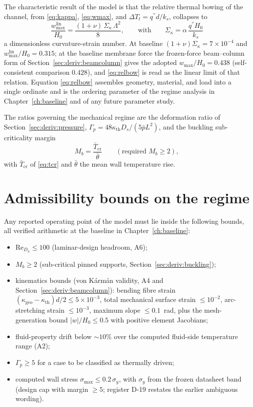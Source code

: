 The characteristic result of the model is that the relative thermal bowing of the channel,
from \eqref{eq:kappa}, \eqref{eq:wmax}, and $\Delta T_t=q^{''}d/k_s$, collapses to
\begin{equation}
\frac{w_{\max}^{\mathrm{lin}}}{H_0}=\frac{(1+\nu)\,\Sigma_\kappa\,\Lambda^2}{8},
\qquad\text{with}\qquad
\Sigma_\kappa=\alpha\,\frac{q^{''}H_0}{k_s}
\label{eq:relbow}
\end{equation}
a dimensionless curvature-strain number. At baseline $(1+\nu)\Sigma_\kappa=7\times10^{-4}$ and
$w_{\max}^{\mathrm{lin}}/H_0=0.315$; at the baseline membrane force the frozen-force
beam--column form of Section~\ref{sec:deriv:beamcolumn} gives the adopted
$w_{\max}/H_0=0.438$ (self-consistent comparison $0.428$), and \eqref{eq:relbow} is read as
the linear limit of that relation. Equation \eqref{eq:relbow} assembles geometry, material, and
load into a single ordinate and is the ordering parameter of the regime analysis in
Chapter~\ref{ch:baseline} and of any future parameter study.

The ratios governing the mechanical regime are the deformation ratio of
Section~\ref{sec:deriv:pressure},
$\Gamma_p=48\kappa_{\mathrm{th}}D_s/(5\bar pL^2)$, and the buckling sub-criticality margin
\begin{equation}
M_b=\frac{\bar T_{\mathrm{cr}}}{\bar\theta}\qquad(\text{required } M_b\ge2) ,
\end{equation}
with $\bar T_{\mathrm{cr}}$ of \eqref{eq:tcr} and $\bar\theta$ the mean wall temperature rise.

\section{Admissibility bounds on the regime}
Any reported operating point of the model must lie inside the following bounds, all verified
arithmetic at the baseline in Chapter~\ref{ch:baseline}:
\begin{itemize}\itemsep1pt
\item[A-1] $\mathrm{Re}_{D_h}\le100$ (laminar-design headroom, A6);
\item[A-2] $M_b\ge2$ (sub-critical pinned supports, Section~\ref{sec:deriv:buckling});
\item[A-3] kinematics bounds (von K\'arm\'an validity, A4 and
Section~\ref{sec:deriv:beamcolumn}): bending fibre strain
$(\kappa_{\mathrm{geo}}-\kappa_{\mathrm{th}})d/2\le5\times10^{-3}$, total mechanical surface
strain $\le10^{-2}$, arc-stretching strain $\le10^{-3}$, maximum slope $\le0.1$~rad, plus the
mesh-generation bound $|w|/H_0\le0.5$ with positive element Jacobians;
\item[A-4] fluid-property drift below $\sim10\%$ over the computed fluid-side temperature range (A2);
\item[A-5] $\Gamma_p\ge5$ for a case to be classified as thermally driven;
\item[A-6] computed wall stress $\sigma_{\max}\le0.2\,\sigma_y$, with $\sigma_y$ from the frozen
datasheet band (design cap with margin $\ge5$; register D-19 restates the earlier ambiguous
wording).
\end{itemize}

